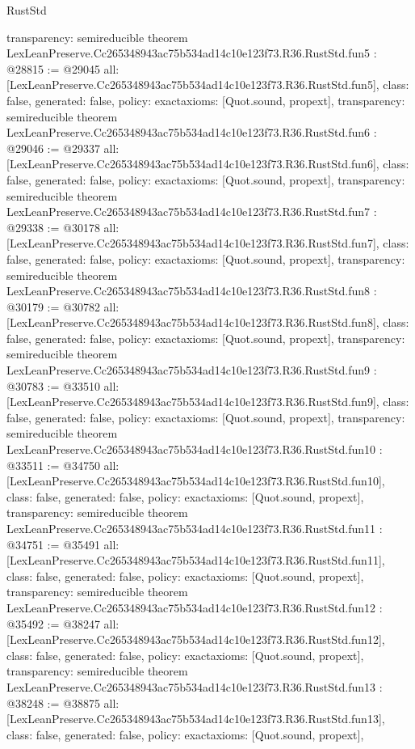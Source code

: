 \begin{lexlean}{RustStd}
\begin{coremodule}
{  transparency: semireducible
}
theorem LexLeanPreserve.Cc265348943ac75b534ad14c10e123f73.R36.RustStd.fun5 : @28815 := @29045 {
  all: [LexLeanPreserve.Cc265348943ac75b534ad14c10e123f73.R36.RustStd.fun5],
  class: false,
  generated: false,
  policy: exact{axioms: [Quot.sound, propext]},
  transparency: semireducible
}
theorem LexLeanPreserve.Cc265348943ac75b534ad14c10e123f73.R36.RustStd.fun6 : @29046 := @29337 {
  all: [LexLeanPreserve.Cc265348943ac75b534ad14c10e123f73.R36.RustStd.fun6],
  class: false,
  generated: false,
  policy: exact{axioms: [Quot.sound, propext]},
  transparency: semireducible
}
theorem LexLeanPreserve.Cc265348943ac75b534ad14c10e123f73.R36.RustStd.fun7 : @29338 := @30178 {
  all: [LexLeanPreserve.Cc265348943ac75b534ad14c10e123f73.R36.RustStd.fun7],
  class: false,
  generated: false,
  policy: exact{axioms: [Quot.sound, propext]},
  transparency: semireducible
}
theorem LexLeanPreserve.Cc265348943ac75b534ad14c10e123f73.R36.RustStd.fun8 : @30179 := @30782 {
  all: [LexLeanPreserve.Cc265348943ac75b534ad14c10e123f73.R36.RustStd.fun8],
  class: false,
  generated: false,
  policy: exact{axioms: [Quot.sound, propext]},
  transparency: semireducible
}
theorem LexLeanPreserve.Cc265348943ac75b534ad14c10e123f73.R36.RustStd.fun9 : @30783 := @33510 {
  all: [LexLeanPreserve.Cc265348943ac75b534ad14c10e123f73.R36.RustStd.fun9],
  class: false,
  generated: false,
  policy: exact{axioms: [Quot.sound, propext]},
  transparency: semireducible
}
theorem LexLeanPreserve.Cc265348943ac75b534ad14c10e123f73.R36.RustStd.fun10 : @33511 := @34750 {
  all: [LexLeanPreserve.Cc265348943ac75b534ad14c10e123f73.R36.RustStd.fun10],
  class: false,
  generated: false,
  policy: exact{axioms: [Quot.sound, propext]},
  transparency: semireducible
}
theorem LexLeanPreserve.Cc265348943ac75b534ad14c10e123f73.R36.RustStd.fun11 : @34751 := @35491 {
  all: [LexLeanPreserve.Cc265348943ac75b534ad14c10e123f73.R36.RustStd.fun11],
  class: false,
  generated: false,
  policy: exact{axioms: [Quot.sound, propext]},
  transparency: semireducible
}
theorem LexLeanPreserve.Cc265348943ac75b534ad14c10e123f73.R36.RustStd.fun12 : @35492 := @38247 {
  all: [LexLeanPreserve.Cc265348943ac75b534ad14c10e123f73.R36.RustStd.fun12],
  class: false,
  generated: false,
  policy: exact{axioms: [Quot.sound, propext]},
  transparency: semireducible
}
theorem LexLeanPreserve.Cc265348943ac75b534ad14c10e123f73.R36.RustStd.fun13 : @38248 := @38875 {
  all: [LexLeanPreserve.Cc265348943ac75b534ad14c10e123f73.R36.RustStd.fun13],
  class: false,
  generated: false,
  policy: exact{axioms: [Quot.sound, propext]},
}
\end{coremodule}
\end{lexlean}
